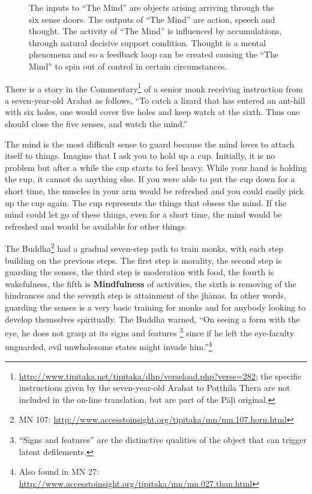 \begin{figure}[h]
\centering

\caption{The inputs to “The Mind” are objects arising arriving through the six sense doors. The outputs of “The Mind” are action, speech and thought. The activity of “The Mind” is influenced by accumulations, through natural decisive support condition. Thought is a mental phenomena and so a feedback loop can be created causing the “The Mind” to spin out of control in certain circumstances.}
\label{fig:Feedback}
\end{figure}

There is a story in the Commentary\footnote{\url{http://www.tipitaka.net/tipitaka/dhp/verseload.php?verse=282}; the specific instructions given by the seven-year-old Arahat to Poṭṭhila Thera are not included in the on-line translation, but are part of the Pāḷi original.} of a senior monk receiving instruction from a seven-year-old Arahat as follows, “To catch a lizard that has entered an ant-hill with six holes, one would cover five holes and keep watch at the sixth. Thus one should close the five senses, and watch the mind.”

The mind is the most difficult sense to guard because the mind loves to attach itself to things. Imagine that I ask you to hold up a cup. Initially, it is no problem but after a while the cup starts to feel heavy. While your hand is holding the cup, it cannot do anything else. If you were able to put the cup down for a short time, the muscles in your arm would be refreshed and you could easily pick up the cup again. The cup represents the things that obsess the mind. If the mind could let go of these things, even for a short time, the mind would be refreshed and would be available for other things.

The Buddha\footnote{MN 107: \url{http://www.accesstoinsight.org/tipitaka/mn/mn.107.horn.html}} had a gradual seven-step path to train monks, with each step building on the previous steps. The first step is morality, the second step is guarding the senses, the third step is moderation with food, the fourth is wakefulness, the fifth is \textbf{Mindfulness} of activities, the sixth is removing of the hindrances and the seventh step is attainment of the jhānas. In other words, guarding the senses is a very basic training for monks and for anybody looking to develop themselves spiritually. The Buddha warned, “On seeing a form with the eye, he does not grasp at its signs and features \footnote{“Signs and features” are the distinctive qualities of the object that can trigger latent defilements.} since if he left the eye-faculty unguarded, evil unwholesome states might invade him.”\footnote{Also found in MN 27: \url{http://www.accesstoinsight.org/tipitaka/mn/mn.027.than.html}}

